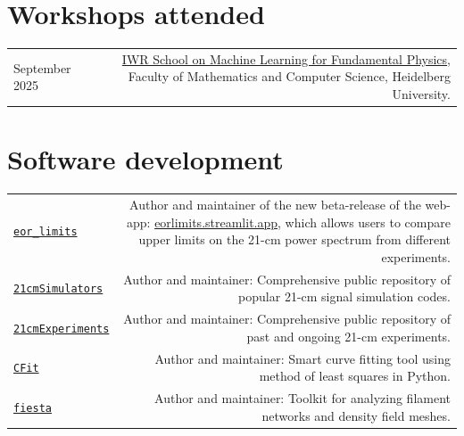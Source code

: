 \documentclass{article}
\begin{document}

\section*{Workshops attended}
\begin{longtable}{L!{\vrule}R}

    September 2025 & \href{https://indico.physi.uni-heidelberg.de/event/1053/}{IWR School on Machine Learning for Fundamental Physics}, Faculty of Mathematics and Computer Science, Heidelberg University. \\

\end{longtable}

\section*{Software development}

\begin{longtable}{L!{\vrule}R}
  
    \href{https://github.com/JitenDhandha/eor_limits}{\texttt{eor\_limits}} & Author and maintainer of the new beta-release of the web-app: \href{https://eorlimits.streamlit.app/}{eorlimits.streamlit.app}, which allows users to compare upper limits on the 21-cm power spectrum from different experiments.\\
  
    \href{https://github.com/JitenDhandha/21cmSimulators}{\texttt{21cmSimulators}} & Author and maintainer: Comprehensive public repository of popular 21-cm signal simulation codes. \\
  
    \href{https://github.com/JitenDhandha/21cmExperiments}{\texttt{21cmExperiments}} & Author and maintainer: Comprehensive public repository of past and ongoing 21-cm experiments. \\
	
    \href{https://github.com/JitenDhandha/CFit}{\texttt{CFit}} & Author and maintainer: Smart curve fitting tool using method of least squares in Python.\\
	
    \href{https://fiesta-astro.readthedocs.io}{\texttt{fiesta}} & Author and maintainer: Toolkit for analyzing filament networks and density field meshes. \\

\end{longtable}
\end{document}
